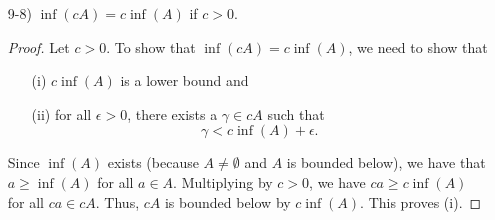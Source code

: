 \documentclass[11pt,a4paper]{article}
\begin{document}
\begin{enumerate}
\begin{enumerate}
\begin{proof}
               \end{proof} 
        \item[9-8)] \( \inf(cA) = c \inf (A)  \) if \( c > 0  \).
            \begin{proof}
            Let \( c > 0  \). To show that \( \inf(cA) = c \inf(A) \), we need to show that 
            \begin{enumerate}
                \item[(i)] \( c \inf(A) \) is a lower bound and 
                \item[(ii)] for all \( \epsilon > 0  \), there exists a \( \gamma \in cA    \) such that 
                    \[  \gamma < c \inf(A) + \epsilon.  \]
            \end{enumerate}

            Since \( \inf(A) \) exists (because \( A \neq \emptyset  \) and \( A  \) is bounded below), we have that \( a \geq \inf(A)  \) for all \( a \in A  \). Multiplying by \( c > 0  \), we have \( ca \geq c\inf(A)  \) for all \( ca \in cA \). Thus, \( cA  \) is bounded below by \( c \inf(A) \). This proves (i).


\end{proof}
\end{enumerate}
\end{enumerate}
\end{document}
